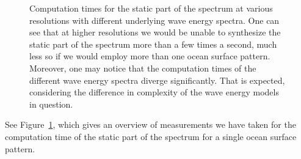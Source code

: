 \begin{figure}
\centering
\mydata
{}
\caption{Computation times for the static part of the spectrum at various
resolutions with different underlying wave energy spectra.
One can see that at higher resolutions we would be unable to synthesize the
static part of the spectrum more than a few times a second, much less so if we
would employ more than one ocean surface pattern.
Moreover, one may notice that the computation times of the different wave
energy spectra diverge significantly. That is expected, considering
the difference in complexity of the wave energy models in question.
}
\label{fig:results:h0}
\end{figure}
%
See Figure~\ref{fig:results:h0}, which gives an overview of measurements we
have taken for the computation time of the static part of the spectrum for a
single ocean surface pattern.

